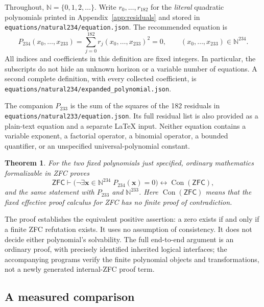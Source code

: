 \documentclass[11pt,a4paper]{article}
\newtheorem{theorem}{Theorem}[section]
\theoremstyle{remark}
\newcommand{\N}{\mathbb N}
\newcommand{\Con}{\operatorname{Con}}
\newcommand{\ZFC}{\mathsf{ZFC}}
\newcommand{\qref}[1]{\nolinkurl{#1}}
\begin{document}
Throughout, \(\N=\{0,1,2,\ldots\}\). Write \(r_0,\ldots,r_{182}\) for
the \emph{literal} quadratic polynomials printed in Appendix~\ref{app:residuals}
and stored in \qref{equations/natural234/equation.json}. The recommended equation is
\begin{equation}\label{eq:main}
  \boxed{P_{234}(x_0,\ldots,x_{233})=
    \sum_{j=0}^{182}r_j(x_0,\ldots,x_{233})^2=0,
    \qquad (x_0,\ldots,x_{233})\in\N^{234}.}
\end{equation}
All indices and coefficients in this definition are fixed integers. In
particular, the subscripts do not hide an unknown horizon or a variable
number of equations. A second complete definition, with every collected
coefficient, is \qref{equations/natural234/expanded_polynomial.json}.

The companion \(P_{233}\) is the sum of the squares of the 182 residuals in
\qref{equations/natural233/equation.json}. Its full residual list is also
provided as a plain-text equation and a separate LaTeX input. Neither equation
contains a variable exponent, a factorial operator, a binomial operator, a
bounded quantifier, or an unspecified universal-polynomial constant.

\begin{theorem}\label{thm:main}
For the two fixed polynomials just specified, ordinary mathematics formalizable
in ZFC proves
\[
 \ZFC\vdash
 \bigl(\neg\exists\mathbf x\in\N^{234}\;P_{234}(\mathbf x)=0\bigr)
 \longleftrightarrow \Con(\ZFC),
\]
and the same statement with \(P_{233}\) and \(\N^{233}\).
Here \(\Con(\ZFC)\) means that the fixed effective proof calculus for ZFC
has no finite proof of contradiction.
\end{theorem}

The proof establishes the equivalent positive assertion: a zero exists if and
only if a finite ZFC refutation exists. It uses no assumption of consistency.
It does not decide either polynomial's solvability. The full end-to-end
argument is an ordinary proof, with precisely identified inherited logical
interfaces; the accompanying programs verify the finite polynomial objects
and transformations, not a newly generated internal-ZFC proof term.

\subsection{A measured comparison}
\end{document}
